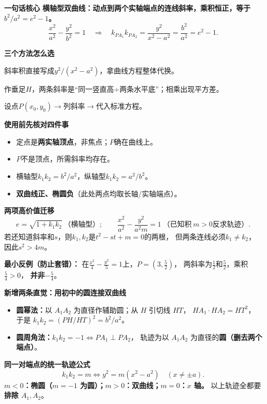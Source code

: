 \begin{summarybox}
\textbf{\textcolor{CSummary}{一句话核心}}
\textbf{横轴型双曲线：动点到两个实轴端点的连线斜率，乘积恒正，等于\(b^2/a^2=e^2-1\)。}
\[
\boxed{
\frac{x^2}{a^2}-\frac{y^2}{b^2}=1\quad\Longrightarrow\quad
k_{PA_1}k_{PA_2}=\frac{y^2}{x^2-a^2}=\frac{b^2}{a^2}=e^2-1.
}
\]

\textbf{\textcolor{CSummary}{三个方法怎么选}}
\begin{description}[style=nextline,leftmargin=2.8em,itemsep=0.25em]
 \item[\textbf{最快（考场）：}]斜率积直接写成\(y^2/(x^2-a^2)\)，拿曲线方程整体代换。
 \item[\textbf{最直观（入门）：}]作垂足\(H\)，两条斜率是“同一竖直高÷两条水平底”；相乘出现平方差。
 \item[\textbf{最规范（书写）：}]设点\(P(x_0,y_0)\)\(\to\)列斜率\(\to\)代入标准方程。
\end{description}

\textbf{\textcolor{CSummary}{使用前先核对四件事}}
\begin{itemize}[leftmargin=*,itemsep=0.28em]
 \item 定点是\textbf{两实轴顶点}，非焦点；\(P\)确在曲线上。
 \item \(P\)不是顶点，所需斜率均存在。
 \item 横轴型\(k_1k_2=b^2/a^2\)，纵轴型\(k_1k_2=a^2/b^2\)。
 \item \textbf{双曲线正、椭圆负}（此处两点均取长轴/实轴端点）。
\end{itemize}

\textbf{\textcolor{CSummary}{两项高价值迁移}}
\[
\boxed{e=\sqrt{1+k_1k_2}}\ \text{（横轴型）};\qquad
\boxed{\frac{x^2}{a^2}-\frac{y^2}{a^2m}=1}\ \text{（已知积}\ m>0\text{反求轨迹）}.
\]
若还知道斜率和\(s\)，则\(k_1,k_2\)是\(t^2-st+m=0\)的两根，
但两条连线必须\(k_1\ne k_2\)，因此\(\boxed{s^2>4m}\)。

\textbf{\textcolor{CSummary}{最小反例（防止套错）：}}
在\(\frac{x^2}{4}-\frac{y^2}{5}=1\)上，\(P=(3,\frac52)\)，
两斜率为\(\frac12\)和\(\frac52\)，乘积\(\frac54>0\)，
\textbf{并非}\(-\frac54\)。

\medskip
\textbf{\textcolor{CSummary}{新增两条直觉：用初中的圆连接双曲线}}
\begin{itemize}[leftmargin=*,itemsep=.2em]
 \item \textbf{圆幂法：}以 $A_1A_2$ 为直径作辅助圆；从 $H$ 引切线 $HT$，
 $HA_1\cdot HA_2=HT^2$，于是 $\boxed{k_1k_2=(PH/HT)^2=b^2/a^2}$。
 \item \textbf{圆周角法：}$k_1k_2=-1\iff PA_1\perp PA_2$，
 轨迹为以 $A_1A_2$ 为直径的\textbf{圆（删去两个端点）}。
\end{itemize}
\textbf{\textcolor{CSummary}{同一对端点的统一轨迹公式}}
\[
 \boxed{k_1k_2=m\iff y^2=m(x^2-a^2)}\quad(x\ne\pm a).
\]
\textbf{$m<0$：椭圆（$m=-1$ 为圆）；$m>0$：双曲线；$m=0$：$x$ 轴。}
以上轨迹全都要\textbf{排除 $A_1,A_2$}。


\end{summarybox}
